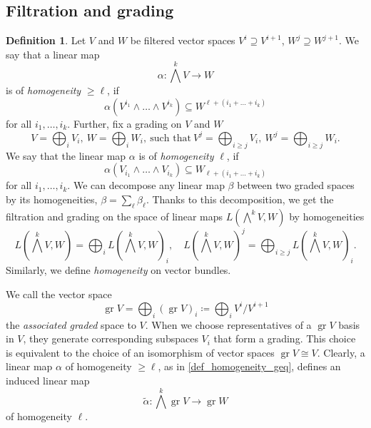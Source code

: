 \documentclass{amsart}
\theoremstyle{plain}
\theoremstyle{definition}
\newtheorem*{definition}{Definition}
\theoremstyle{remark}
\newcommand{\on}[1]{\operatorname{#1}}
\begin{document}
\subsection{Filtration and grading}
\begin{definition}
    Let $V$ and $W$ be filtered vector spaces $V^i \supseteq V^{i+1}$, $W^j \supseteq W^{j+1}$. We say that a linear map
    \[ \textstyle \alpha\colon \bigwedge^k V \to W \]
    is of \emph{homogeneity} $\geq \ell$, if
    \begin{equation}\label{def_homogeneity_geq}
        \alpha (V^{i_1} \wedge \dots \wedge V^{i_k}) \subseteq W^{\ell + (i_1+\dots+i_k)}
    \end{equation}
    for all $i_1, \dots, i_k$. Further, fix a grading on $V$ and $W$
    \begin{equation*}
        \textstyle V = \bigoplus_i V_i,\ W = \bigoplus_i W_i,\ \text{such that}\ V^j = \bigoplus_{i \geq j} V_i,\ W^j = \bigoplus_{i \geq j} W_i.
    \end{equation*}
    We say that the linear map $\alpha$ is of \emph{homogeneity} $\ell$, if
    \begin{equation*}
        \alpha (V_{i_1} \wedge \dots \wedge V_{i_k}) \subseteq W_{\ell + (i_1+\dots+i_k)}
    \end{equation*}
    for all $i_1, \dots, i_k$. We can decompose any linear map $\beta$ between two graded spaces by its homogeneities, $\beta = \sum_\ell \beta_\ell$. Thanks to this decomposition, we get the filtration and grading on the space of linear maps $L(\bigwedge^k V,W)$ by homogeneities
    \begin{equation} \label{linear_map_homogeneities}
        \textstyle L(\bigwedge^k V,W) = \bigoplus_i L(\bigwedge^k V,W)_i, \quad
    L(\bigwedge^k V,W)^j = \bigoplus_{i \geq j} L(\bigwedge^k V,W)_i.
    \end{equation}
    Similarly, we define \emph{homogeneity} on vector bundles. 
    
    We call the vector space
    \[ \on{gr} V = \bigoplus_i (\on{gr} V)_i \coloneqq \bigoplus_i V^i/V^{i+1} \]
    the \emph{associated graded} space to $V$. When we choose representatives of a $\on{gr} V$ basis in $V$, they generate corresponding subspaces $V_i$ that form a grading. This choice is equivalent to the choice of an isomorphism of vector spaces $\on{gr} V \cong V$. Clearly, a linear map $\alpha$ of homogeneity $\geq \ell$, as in \eqref{def_homogeneity_geq}, defines an induced linear map
    \[ \widetilde{\alpha}\colon {\textstyle \bigwedge^k} \on{gr} V \to \on{gr} W  \]
    of homogeneity $\ell$.
\end{definition}
\end{document}

